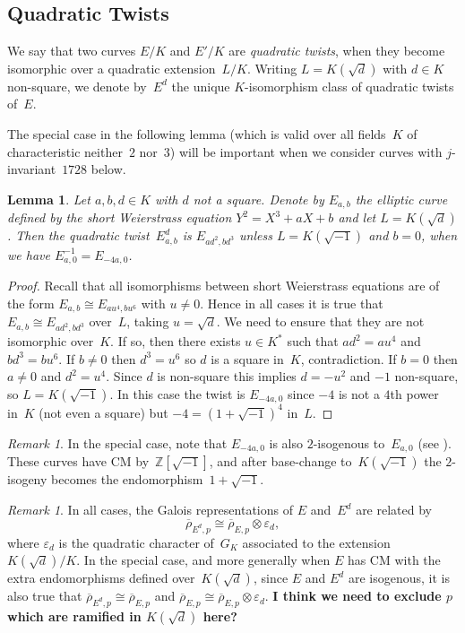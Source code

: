\documentclass[12pt]{amsart}
\newcommand{\Z}{\mathbb{Z}}
\newcommand{\rhobar}{{\overline{\rho}}}
\newcommand{\eps}{\varepsilon}
\numberwithin{equation}{section}
\newtheorem{lemma}[theorem]{Lemma}
\theoremstyle{definition}
\theoremstyle{remark}
\newtheorem{remark}[theorem]{Remark}
\begin{document}
\subsection{Quadratic Twists}

We say that two curves $E/K$ and $E'/K$ are {\em quadratic twists},
when they become isomorphic over a quadratic extension~$L/K$.  Writing
$L=K(\sqrt{d})$ with $d\in K$ non-square, we denote by~$E^d$ the unique $K$-isomorphism class of quadratic twists of~$E$.

The special case in the following lemma (which is valid over all
fields~$K$ of characteristic neither~$2$ nor~$3$) will be important
when we consider curves with $j$-invariant~$1728$ below.

\begin{lemma}\label{L:quadratic-twist} Let $a, b , d\in K$ with $d$ not a square. Denote by $E_{a,b}$ the elliptic curve defined by the short Weierstrass equation $Y^2=X^3+aX+b$ and 
let $L=K(\sqrt{d})$. Then the quadratic
twist~$E_{a,b}^d$ is $E_{ad^2,bd^3}$ unless $L=K(\sqrt{-1})$ and
$b=0$, when we have $E_{a,0}^{-1}=E_{-4a,0}$.
\end{lemma}
\begin{proof}
Recall that all isomorphisms between short Weierstrass equations are
of the form $E_{a,b}\cong E_{au^4,bu^6}$ with $u\not=0$.  Hence in all
cases it is true that $E_{a,b}\cong E_{ad^2,bd^3}$ over~$L$, taking
$u=\sqrt{d}$. We need to ensure that they are not isomorphic over~$K$.
If so, then there exists $u\in K^*$ such that $ad^2=au^4$ and
$bd^3=bu^6$.  If $b\not=0$ then $d^3=u^6$ so $d$ is a square in~$K$,
contradiction.  If $b=0$ then $a\not=0$ and $d^2=u^4$.  Since $d$ is
non-square this implies $d=-u^2$ and $-1$ non-square, so
$L=K(\sqrt{-1})$.  In this case the twist is $E_{-4a,0}$ since $-4$ is
not a $4$th power in~$K$ (not even a square) but $-4=(1+\sqrt{-1})^4$
in~$L$.
\end{proof}

\begin{remark}\label{R:2-isog}
In the special case, note that $E_{-4a,0}$ is also $2$-isogenous
to~$E_{a,0}$ (see \cite[p. 336]{SilvermanI}).  These curves have CM
by~$\Z[\sqrt{-1}]$, and after base-change to~$K(\sqrt{-1})$ the
$2$-isogeny becomes the endomorphism~$1+\sqrt{-1}$.
\end{remark}

\begin{remark}
In all cases, the Galois representations of $E$ and~$E^d$ are related
by
\begin{equation}
  \rhobar_{E^d,p} \cong \rhobar_{E,p}\otimes\eps_d, \label{E:rho-twist}
\end{equation}
where $\eps_d$ is the quadratic character of~$G_K$ associated to the
extension $K(\sqrt{d})/K$.  In the special case, and more generally
when $E$ has CM with the extra endomorphisms defined
over~$K(\sqrt{d})$, since $E$ and $E^{d}$ are isogenous, it is also
true that $\rhobar_{E^d,p} \cong \rhobar_{E,p}$ and $\rhobar_{E,p}
\cong \rhobar_{E,p}\otimes\eps_d$.
\textbf{I think we need to exclude $p$ which are ramified in
  $K(\sqrt{d})$ here?}
\end{remark}
\end{document}
